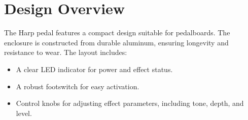\chapter{Design Overview}

The Harp pedal features a compact design suitable for pedalboards. The enclosure is constructed from durable aluminum, ensuring longevity and resistance to wear. The layout includes:
\begin{itemize}
\item A clear LED indicator for power and effect status.
\item A robust footswitch for easy activation.
\item Control knobs for adjusting effect parameters, including tone, depth, and level.
\end{itemize}

